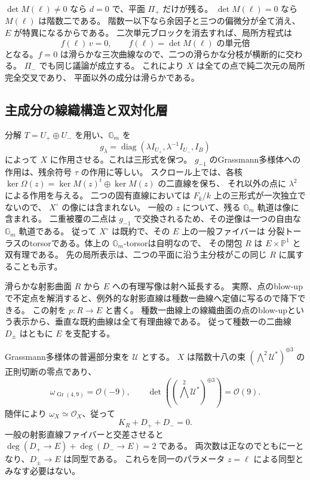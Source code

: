 $\det M(\ell)\ne0$ なら $d=0$ で、平面 $\Pi_+$ だけが残る。
$\det M(\ell)=0$ なら $M(\ell)$ は階数二である。
階数一以下なら余因子と三つの偏微分が全て消え、$E$ が特異になるからである。
二次単元ブロックを消去すれば、局所方程式は
\[
 f(\ell)\,v=0,\qquad f(\ell)=\det M(\ell)\text{ の単元倍}
\]
となる。$f=0$ は滑らかな三次曲線なので、二つの滑らかな分枝が横断的に交わる。
$\Pi_-$ でも同じ議論が成立する。
これにより $X$ は全ての点で純二次元の局所完全交叉であり、
平面以外の成分は滑らかである。

\subsection{主成分の線織構造と双対化層}

分解 $T=U_+\oplus U_-$ を用い、$\mathbb G_m$ を
\[
 g_\lambda=\operatorname{diag}(\lambda I_{U_+},\lambda^{-1}I_{U_-},I_B)
\]
によって $X$ に作用させる。これは三形式を保つ。
$g_{-1}$ のGrassmann多様体への作用は、残余符号 $\tau$ の作用に等しい。
スクロール上では、各核
$\ker\Omega(z)=\ker M(z)^t\oplus\ker M(z)$ の二直線を保ち、
それ以外の点に $\lambda^2$ による作用を与える。
二つの固有直線においては $F_k/k$ 上の三形式が一次独立でないので、
$X^\circ$ の像には含まれない。
一般の $z$ について、残る $\mathbb G_m$ 軌道は像に含まれる。
二重被覆の二点は $g_{-1}$ で交換されるため、その逆像は一つの自由な
$\mathbb G_m$ 軌道である。
従って $X^\circ$ は既約で、その $E$ 上の一般ファイバーは
分裂トーラスのtorsorである。体上の $\mathbb G_m$-torsorは自明なので、
その閉包 $R$ は $E\times\mathbb P^1$ と双有理である。
先の局所表示は、二つの平面に沿う主分枝がこの同じ $R$ に属することも示す。

滑らかな射影曲面 $R$ から $E$ への有理写像は射へ延長する。
実際、点のblow-upで不定点を解消すると、例外的な射影直線は種数一曲線へ定値に写るので降下できる。
この射を $p:R\to E$ と書く。
種数一曲線上の線織曲面の点のblow-upという表示から、垂直な既約曲線は全て有理曲線である。
従って種数一の二曲線 $D_\pm$ はともに $E$ を支配する。

Grassmann多様体の普遍部分束を $\mathcal U$ とする。
$X$ は階数十八の束 $(\bigwedge^2\mathcal U^*)^{\oplus3}$ の正則切断の零点であり、
\[
 \omega_{\operatorname{Gr}(4,9)}=\mathcal O(-9),\qquad
 \det((\bigwedge^2\mathcal U^*)^{\oplus3})=\mathcal O(9).
\]
随伴により $\omega_X\simeq\mathcal O_X$、従って
\begin{equation}\label{eq:anticanonical-boundary-v28}
 K_R+D_++D_-=0.
\end{equation}
一般の射影直線ファイバーと交差させると
$\deg(D_+\to E)+\deg(D_-\to E)=2$ である。
両次数は正なのでともに一となり、$D_\pm\to E$ は同型である。
これらを同一のパラメータ $z=\ell$ による同型とみなす必要はない。

